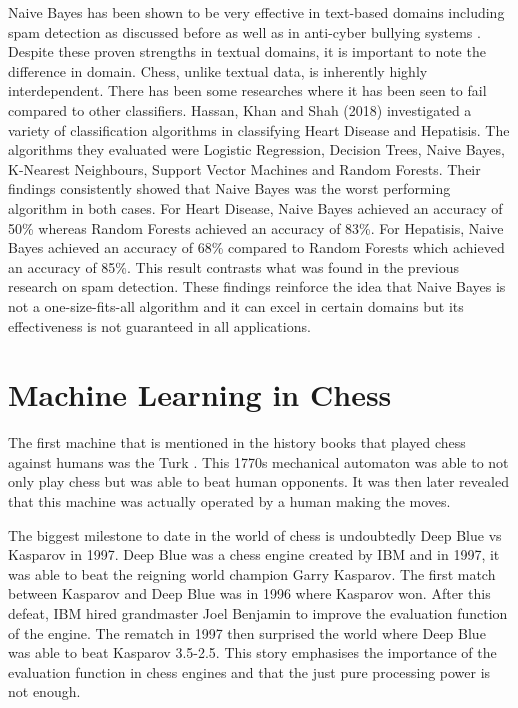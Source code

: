 Naive Bayes has been shown to be very effective in text-based domains including spam detection as discussed before as well as in anti-cyber bullying systems \cite{igeAIPoweredAntiCyber2022}. Despite these proven strengths in textual domains, it is important to note the difference in domain. Chess, unlike textual data, is inherently highly interdependent. There has been some researches where it has been seen to fail compared to other classifiers. Hassan, Khan and Shah (2018) \cite{ulhassanComparisonMachineLearning2018} investigated a variety of classification algorithms in classifying Heart Disease and Hepatisis. The algorithms they evaluated were Logistic Regression, Decision Trees, Naive Bayes, K-Nearest Neighbours, Support Vector Machines and Random Forests. Their findings consistently showed that Naive Bayes was the worst performing algorithm in both cases. For Heart Disease, Naive Bayes achieved an accuracy of 50\% whereas Random Forests achieved an accuracy of 83\%. For Hepatisis, Naive Bayes achieved an accuracy of 68\% compared to Random Forests which achieved an accuracy of 85\%. This result contrasts what was found in the previous research on spam detection. These findings reinforce the idea that Naive Bayes is not a one-size-fits-all algorithm and it can excel in certain domains but its effectiveness is not guaranteed in all applications. 

\section{Machine Learning in Chess}

The first machine that is mentioned in the history books that played chess against humans was the Turk \cite{stephensMechanicalTurkShort2023}. This 1770s mechanical automaton was able to not only play chess but was able to beat human opponents. It was then later revealed that this machine was actually operated by a human making the moves. 

The biggest milestone to date in the world of chess is undoubtedly Deep Blue vs Kasparov in 1997. Deep Blue was a chess engine created by IBM and in 1997, it was able to beat the reigning world champion Garry Kasparov. The first match between Kasparov and Deep Blue was in 1996 where Kasparov won. After this defeat, IBM hired grandmaster Joel Benjamin to improve the evaluation function of the engine. The rematch in 1997 then surprised the world where Deep Blue was able to beat Kasparov 3.5-2.5. This story emphasises the importance of the evaluation function in chess engines and that the just pure processing power is not enough. 

